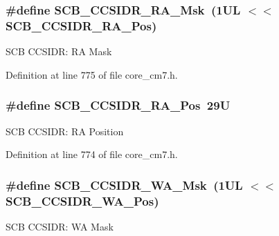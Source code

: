 \subsubsection[{\texorpdfstring{S\+C\+B\+\_\+\+C\+C\+S\+I\+D\+R\+\_\+\+R\+A\+\_\+\+Msk}{SCB_CCSIDR_RA_Msk}}]{\setlength{\rightskip}{0pt plus 5cm}\#define S\+C\+B\+\_\+\+C\+C\+S\+I\+D\+R\+\_\+\+R\+A\+\_\+\+Msk~(1\+U\+L $<$$<$ S\+C\+B\+\_\+\+C\+C\+S\+I\+D\+R\+\_\+\+R\+A\+\_\+\+Pos)}\hypertarget{group___c_m_s_i_s___s_c_b_gaa77f28cbf94b44c1114a66e05cc43255}{}\label{group___c_m_s_i_s___s_c_b_gaa77f28cbf94b44c1114a66e05cc43255}
S\+CB C\+C\+S\+I\+DR\+: RA Mask 

Definition at line 775 of file core\+\_\+cm7.\+h.

\subsubsection[{\texorpdfstring{S\+C\+B\+\_\+\+C\+C\+S\+I\+D\+R\+\_\+\+R\+A\+\_\+\+Pos}{SCB_CCSIDR_RA_Pos}}]{\setlength{\rightskip}{0pt plus 5cm}\#define S\+C\+B\+\_\+\+C\+C\+S\+I\+D\+R\+\_\+\+R\+A\+\_\+\+Pos~29U}\hypertarget{group___c_m_s_i_s___s_c_b_ga379743eea011cede0032ecb7812b51e1}{}\label{group___c_m_s_i_s___s_c_b_ga379743eea011cede0032ecb7812b51e1}
S\+CB C\+C\+S\+I\+DR\+: RA Position 

Definition at line 774 of file core\+\_\+cm7.\+h.

\subsubsection[{\texorpdfstring{S\+C\+B\+\_\+\+C\+C\+S\+I\+D\+R\+\_\+\+W\+A\+\_\+\+Msk}{SCB_CCSIDR_WA_Msk}}]{\setlength{\rightskip}{0pt plus 5cm}\#define S\+C\+B\+\_\+\+C\+C\+S\+I\+D\+R\+\_\+\+W\+A\+\_\+\+Msk~(1\+U\+L $<$$<$ S\+C\+B\+\_\+\+C\+C\+S\+I\+D\+R\+\_\+\+W\+A\+\_\+\+Pos)}\hypertarget{group___c_m_s_i_s___s_c_b_ga519ebde5ad64be2098f586bddbc8e898}{}\label{group___c_m_s_i_s___s_c_b_ga519ebde5ad64be2098f586bddbc8e898}
S\+CB C\+C\+S\+I\+DR\+: WA Mask 

